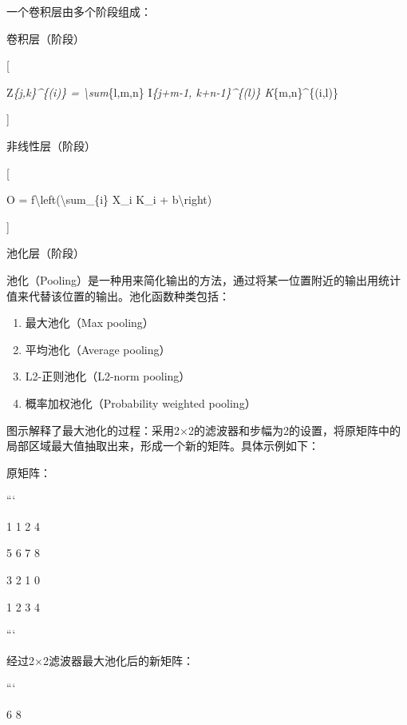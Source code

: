 一个卷积层由多个阶段组成：

卷积层（阶段）

{[}

Z\emph{\{j,k\}\^{}\{(i)\} = \textbackslash sum}\{l,m,n\} I\emph{\{j+m-1,
k+n-1\}\^{}\{(l)\} K}\{m,n\}\^{}\{(i,l)\}

{]}


非线性层（阶段）

{[}

O = f\textbackslash left(\textbackslash sum\_\{i\} X\_i K\_i +
b\textbackslash right)

{]}


池化层（阶段）

池化（Pooling）是一种用来简化输出的方法，通过将某一位置附近的输出用统计值来代替该位置的输出。池化函数种类包括：

\begin{enumerate}
\def\labelenumi{\arabic{enumi}.}
\item
  最大池化（Max pooling）
\item
  平均池化（Average pooling）
\item
  L2-正则池化（L2-norm pooling）
\item
  概率加权池化（Probability weighted pooling）
\end{enumerate}


图示解释了最大池化的过程：采用2×2的滤波器和步幅为2的设置，将原矩阵中的局部区域最大值抽取出来，形成一个新的矩阵。具体示例如下：

原矩阵：

```

1 1 2 4

5 6 7 8

3 2 1 0

1 2 3 4

```

经过2×2滤波器最大池化后的新矩阵：

```

6 8

